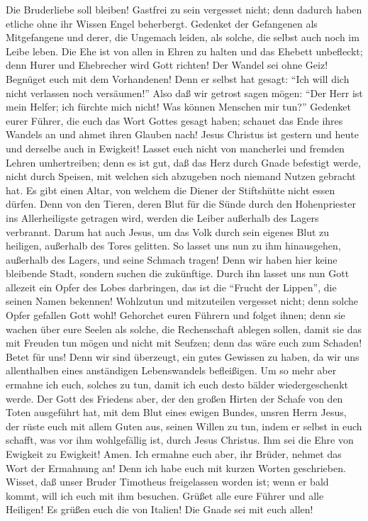  Die Bruderliebe soll bleiben!  Gastfrei zu
sein vergesset nicht; denn dadurch haben etliche ohne ihr Wissen Engel
beherbergt.  Gedenket der Gefangenen als Mitgefangene und
derer, die Ungemach leiden, als solche, die selbst auch noch im Leibe
leben.  Die Ehe ist von allen in Ehren zu halten und das
Ehebett unbefleckt; denn Hurer und Ehebrecher wird Gott richten!
 Der Wandel sei ohne Geiz! Begnüget euch mit dem
Vorhandenen! Denn er selbst hat gesagt: ``Ich will dich nicht verlassen
noch versäumen!''  Also daß wir getrost sagen mögen: ``Der
Herr ist mein Helfer; ich fürchte mich nicht! Was können Menschen mir
tun?''  Gedenket eurer Führer, die euch das Wort Gottes
gesagt haben; schauet das Ende ihres Wandels an und ahmet ihren Glauben
nach!  Jesus Christus ist gestern und heute und derselbe
auch in Ewigkeit!  Lasset euch nicht von mancherlei und
fremden Lehren umhertreiben; denn es ist gut, daß das Herz durch Gnade
befestigt werde, nicht durch Speisen, mit welchen sich abzugeben noch
niemand Nutzen gebracht hat.  Es gibt einen Altar, von
welchem die Diener der Stiftshütte nicht essen dürfen. 
Denn von den Tieren, deren Blut für die Sünde durch den Hohenpriester
ins Allerheiligste getragen wird, werden die Leiber außerhalb des Lagers
verbrannt.  Darum hat auch Jesus, um das Volk durch sein
eigenes Blut zu heiligen, außerhalb des Tores gelitten. 
So lasset uns nun zu ihm hinausgehen, außerhalb des Lagers, und seine
Schmach tragen!  Denn wir haben hier keine bleibende
Stadt, sondern suchen die zukünftige.  Durch ihn lasset
uns nun Gott allezeit ein Opfer des Lobes darbringen, das ist die
``Frucht der Lippen'', die seinen Namen bekennen! 
Wohlzutun und mitzuteilen vergesset nicht; denn solche Opfer gefallen
Gott wohl!  Gehorchet euren Führern und folget ihnen;
denn sie wachen über eure Seelen als solche, die Rechenschaft ablegen
sollen, damit sie das mit Freuden tun mögen und nicht mit Seufzen; denn
das wäre euch zum Schaden!  Betet für uns! Denn wir sind
überzeugt, ein gutes Gewissen zu haben, da wir uns allenthalben eines
anständigen Lebenswandels befleißigen.  Um so mehr aber
ermahne ich euch, solches zu tun, damit ich euch desto bälder
wiedergeschenkt werde.  Der Gott des Friedens aber, der
den großen Hirten der Schafe von den Toten ausgeführt hat, mit dem Blut
eines ewigen Bundes, unsren Herrn Jesus,  der rüste euch
mit allem Guten aus, seinen Willen zu tun, indem er selbst in euch
schafft, was vor ihm wohlgefällig ist, durch Jesus Christus. Ihm sei die
Ehre von Ewigkeit zu Ewigkeit! Amen.  Ich ermahne euch
aber, ihr Brüder, nehmet das Wort der Ermahnung an! Denn ich habe euch
mit kurzen Worten geschrieben.  Wisset, daß unser Bruder
Timotheus freigelassen worden ist; wenn er bald kommt, will ich euch mit
ihm besuchen.  Grüßet alle eure Führer und alle Heiligen!
Es grüßen euch die von Italien!  Die Gnade sei mit euch
allen!
